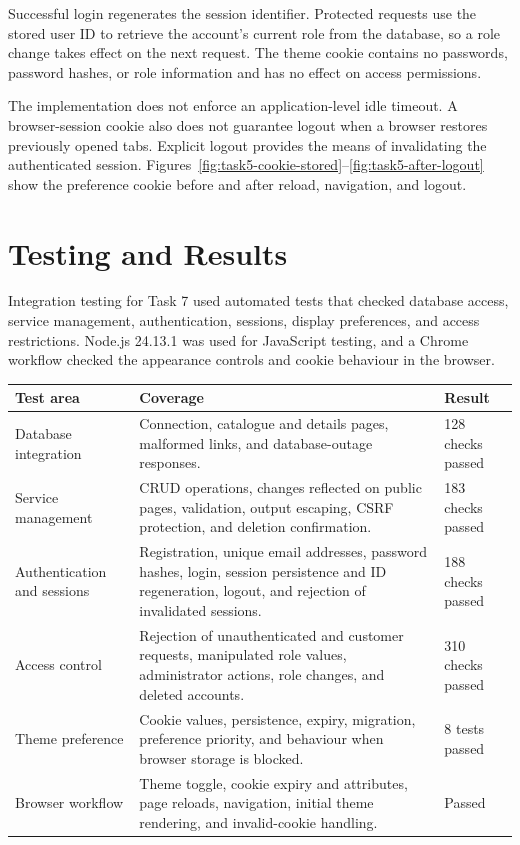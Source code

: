 \documentclass[11pt,a4paper]{article}
\begin{document}
Successful login regenerates the session identifier. Protected requests use the
stored user ID to retrieve the account's current role from the database, so a
role change takes effect on the next request. The theme cookie contains no
passwords, password hashes, or role information and has no effect on access
permissions.

The implementation does not enforce an application-level idle timeout. A
browser-session cookie also does not guarantee logout when a browser restores
previously opened tabs. Explicit logout provides the means of invalidating
the authenticated session.
Figures~\ref{fig:task5-cookie-stored}--\ref{fig:task5-after-logout} show the
preference cookie before and after reload, navigation, and logout.

\clearpage
\section{Testing and Results}

Integration testing for Task 7 used automated tests that
checked database access, service management, authentication, sessions, display
preferences, and access restrictions. Node.js 24.13.1 was used for JavaScript
testing, and a Chrome workflow checked the appearance controls and cookie
behaviour in the browser.

\begin{tabularx}{\linewidth}{@{}P{37mm}YP{24mm}@{}}
\toprule
\textbf{Test area} & \textbf{Coverage} & \textbf{Result} \\
\midrule
Database integration & Connection, catalogue and details pages, malformed
links, and database-outage responses. & 128 checks passed \\
Service management & CRUD operations, changes reflected on public pages,
validation, output escaping, CSRF protection, and deletion confirmation.
& 183 checks passed \\
Authentication and sessions & Registration, unique email addresses, password
hashes, login, session persistence and ID regeneration, logout, and rejection
of invalidated sessions. & 188 checks passed \\
Access control & Rejection of unauthenticated and customer requests,
manipulated role values, administrator actions, role changes, and deleted
accounts. & 310 checks passed \\
Theme preference & Cookie values, persistence, expiry, migration, preference
priority, and behaviour when browser storage is blocked. & 8 tests passed \\
Browser workflow & Theme toggle, cookie expiry and attributes, page reloads,
navigation, initial theme rendering, and invalid-cookie handling. & Passed \\
\bottomrule
\end{tabularx}
\end{document}
